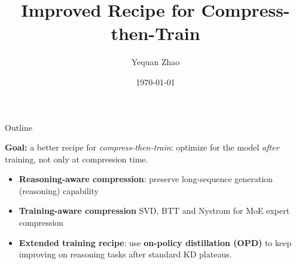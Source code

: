 \documentclass[9pt]{beamer}
\title{Improved Recipe for Compress-then-Train}
\author{Yequan Zhao}
\date{\today}
\begin{document}
	
	\maketitle
	
	\begin{frame}{Outline}
		
		\textbf{Goal:} a better recipe for \emph{compress-then-train}: optimize for the model \emph{after} training, not only at compression time.
		
		\begin{itemize}
			\item \textbf{Reasoning-aware compression}: preserve long-sequence generation (reasoning) capability
			\item \textbf{Training-aware compression} SVD, BTT and Nystrom for MoE expert compression
			\item \textbf{Extended training recipe}: use \textbf{on-policy distillation (OPD)} to keep improving on reasoning tasks after standard KD plateaus.
		\end{itemize}
		
	\end{frame}
	
\end{document}
